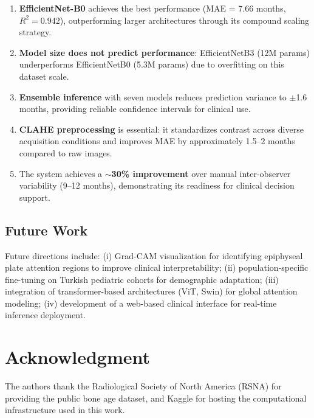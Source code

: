 \documentclass[conference]{IEEEtran}
\begin{document}
\begin{enumerate}
  \item \textbf{EfficientNet-B0} achieves the best performance
        (MAE = 7.66 months, $R^2 = 0.942$), outperforming larger
        architectures through its compound scaling strategy.
  \item \textbf{Model size does not predict performance}: EfficientNetB3
        (12M params) underperforms EfficientNetB0 (5.3M params) due to
        overfitting on this dataset scale.
  \item \textbf{Ensemble inference} with seven models reduces prediction
        variance to $\pm$1.6 months, providing reliable confidence
        intervals for clinical use.
  \item \textbf{CLAHE preprocessing} is essential: it standardizes
        contrast across diverse acquisition conditions and improves MAE
        by approximately 1.5--2 months compared to raw images.
  \item The system achieves a $\sim$\textbf{30\% improvement} over
        manual inter-observer variability (9--12 months), demonstrating
        its readiness for clinical decision support.
\end{enumerate}

\subsection{Future Work}

Future directions include: (i) Grad-CAM visualization for identifying
epiphyseal plate attention regions to improve clinical interpretability;
(ii) population-specific fine-tuning on Turkish pediatric cohorts for
demographic adaptation; (iii) integration of transformer-based
architectures (ViT, Swin) for global attention modeling; (iv)
development of a web-based clinical interface for real-time inference
deployment.

\section*{Acknowledgment}

The authors thank the Radiological Society of North America (RSNA)
for providing the public bone age dataset, and Kaggle for hosting the
computational infrastructure used in this work.
\end{document}

